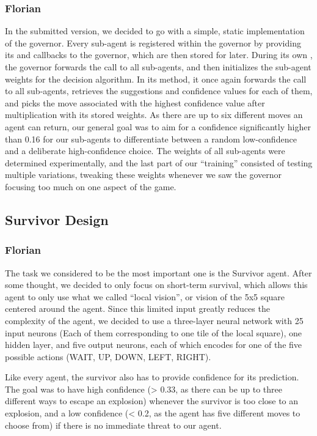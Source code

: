 \subsubsection*{Florian}
\label{subsec:design-governor}
In the submitted version, we decided to go with a simple, static implementation of the governor.
Every sub-agent is registered within the governor by providing its  and 
callbacks to the governor, which are then stored for later.
During its own , the governor forwards the call to all sub-agents, and then initializes the
sub-agent weights for the decision algorithm.
In its  method, it once again forwards the call to all sub-agents, retrieves the suggestions and
confidence values for each of them, and picks the move associated with the highest confidence value after multiplication
with its stored weights.
As there are up to six different moves an agent can return, our general goal was to aim for a confidence significantly
higher than 0.16 for our sub-agents to differentiate between a random low-confidence and a deliberate high-confidence
choice.
The weights of all sub-agents were determined experimentally, and the last part of our \enquote{training} consisted of
testing multiple variations, tweaking these weights whenever we saw the governor focusing too much on one aspect of the
game.

\subsection{Survivor Design}
\subsubsection*{Florian}
\label{subsec:survivor-design}
The task we considered to be the most important one is the Survivor agent.
After some thought, we decided to only focus on short-term survival, which allows this agent to only use what we called
\enquote{local vision}, or vision of the 5x5 square centered around the agent.
Since this limited input greatly reduces the complexity of the agent, we decided to use a three-layer neural network
with 25 input neurons (Each of them corresponding to one tile of the local square), one hidden layer, and five output
neurons, each of which encodes for one of the five possible actions (WAIT, UP, DOWN, LEFT, RIGHT).

Like every agent, the survivor also has to provide confidence for its prediction.
The goal was to have high confidence (> 0.33, as there can be up to three different ways to escape an explosion)
whenever the survivor is too close to an explosion, and a low confidence (< 0.2, as the agent has five different moves
to choose from) if there is no immediate threat to our agent.

